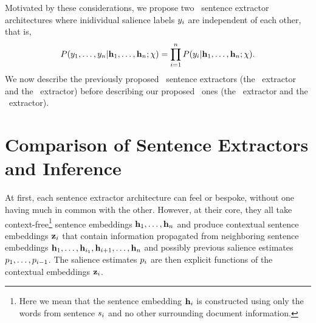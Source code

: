 Motivated by these considerations, we propose two \nonautoregressive~sentence
extractor architectures where inidividual salience labels $y_i$ 
are independent of each other, that is, 
\[P(y_1,\ldots,y_n|\mathbf{h}_1,\ldots,\mathbf{h}_n;\chi) = \prod_{i=1}^n 
P(y_i|\mathbf{h}_1,\ldots,\mathbf{h}_n;\chi).\]
We now describe  the
previously proposed \autoregressive~sentence extractors (the \clext~extractor and  the \srext~extractor) before describing
our proposed \nonautoregressive~ones (the \rnnext~extractor and the \stsext~extractor).


%



%
%

%
%
%










\section{Comparison of Sentence Extractors and Inference}

At first, each sentence extractor architecture can feel 
or bespoke, without one having much in common with the other. However,
at their core, they all take context-free\footnote{Here we mean that 
    the sentence embedding $\mathbf{h}_i$ 
    is constructed using only the words from sentence $s_i$ and no 
other surrounding document information.} sentence embeddings $\mathbf{h}_1,\ldots,
\mathbf{h}_n$ and produce contextual sentence embeddings 
$\mathbf{z}_i$ that contain information propagated from neighboring sentence 
embeddings $\mathbf{h}_1,\ldots,\mathbf{h}_{i_1},\mathbf{h}_{i+1},\ldots,\mathbf{h}_n$ and possibly previous salience estimates $p_1,\ldots,p_{i-1}$.
The salience estimates $p_i$ are then explicit functions of the contextual
embeddings $\mathbf{z}_i$. 

